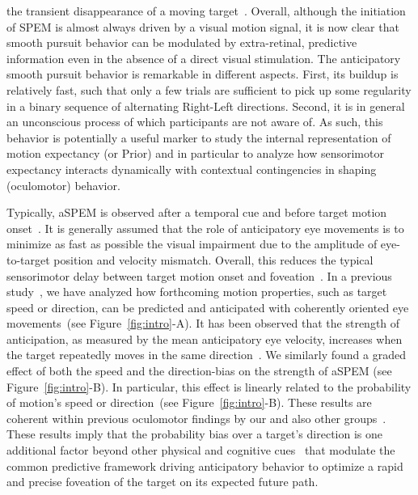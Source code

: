 \documentclass[12pt,english]{article}%
\newcommand{\citep}[1]{\parencite{#1}}
\newcommand{\seeFig}[1]{Figure~\ref{fig:#1}}
\begin{document}
the transient disappearance of a moving target~\citep{Badler2006,BeckerFuchs1985}.
Overall, although the initiation of SPEM is almost always driven by a visual motion signal, it is now clear that smooth pursuit behavior
can be modulated by extra-retinal, predictive information even in the absence of a direct visual stimulation.
The anticipatory smooth pursuit behavior is remarkable
in different aspects.
First, its buildup is relatively fast, such that only a few trials are sufficient
to pick up some regularity in a binary sequence of alternating Right-Left directions.
Second, it is in general an unconscious process
of which participants are not aware of.
As such, this behavior is potentially a useful marker
to study the internal representation of motion expectancy (or Prior) 
and in particular to analyze how sensorimotor expectancy 
interacts dynamically with contextual contingencies in shaping (oculomotor) behavior.

Typically, aSPEM is observed after a temporal cue and
before target motion onset~\citep{Kowler1979a,Kowler1979b, Kowler1984}. %
It is generally assumed that the role of anticipatory eye movements is
to minimize as fast as possible the visual impairment due
to the amplitude of eye-to-target position and velocity mismatch.
Overall, this reduces the typical sensorimotor delay
between target motion onset and foveation~\citep{REFNEEDED}.
In a previous study~\citep{Montagnini2010},
we have analyzed how forthcoming motion properties,
such as target speed or direction, can be
predicted and anticipated with coherently oriented eye movements~(see \seeFig{intro}-A).
It has been observed that the strength of anticipation,
as measured by the mean anticipatory eye velocity,
increases when the target repeatedly moves in the same direction~\citep{Kowler1984, Kowler1989, Heinen2005}.
We similarly found a graded effect of both the speed and the direction-bias
on the strength of aSPEM (see \seeFig{intro}-B).
In particular, this effect is linearly related
to the probability of motion's speed or direction~(see \seeFig{intro}-B).
These results are coherent within previous oculomotor findings
by our and also other groups~\citep{SantosKowler2017}.
These results imply that the probability bias over a target's direction is
one additional factor beyond other physical and cognitive cues~\citep{Kowler2014, SantosKowler2017,Damasse18}
that modulate the common predictive framework
driving anticipatory behavior to optimize a rapid and
precise foveation of the target on its expected future path.
\end{document}
